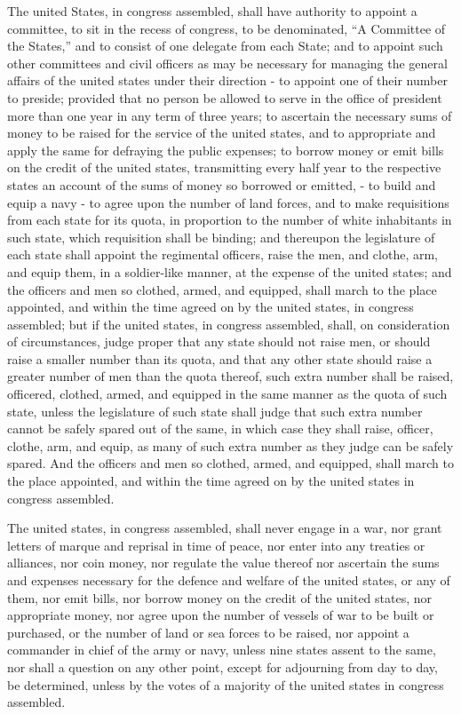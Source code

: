 The united States, in congress assembled, shall have authority to appoint a committee, to sit in the recess of congress, to be denominated, “A Committee of the States,” and to consist of one delegate from each State; and to appoint such other committees and civil officers as may be necessary for managing the general affairs of the united states under their direction - to appoint one of their number to preside; provided that no person be allowed to serve in the office of president more than one year in any term of three years; to ascertain the necessary sums of money to be raised for the service of the united states, and to appropriate and apply the same for defraying the public expenses; to borrow money or emit bills on the credit of the united states, transmitting every half year to the respective states an account of the sums of money so borrowed or emitted, -  to build and equip a navy - to agree upon the number of land forces, and to make requisitions from each state for its quota, in proportion to the number of white inhabitants in such state, which requisition shall be binding; and thereupon the legislature of each state shall appoint the regimental officers, raise the men, and clothe, arm, and equip them, in a soldier-like manner, at the expense of the united states; and the officers and men so clothed, armed, and equipped, shall march to the place appointed, and within the time agreed on by the united states, in congress assembled; but if the united states, in congress assembled, shall, on consideration of circumstances, judge proper that any state should not raise men, or should raise a smaller number than its quota, and that any other state should raise a greater number of men than the quota thereof, such extra number shall be raised, officered, clothed, armed, and equipped in the same manner as the quota of such state, unless the legislature of such state shall judge that such extra number cannot be safely spared out of the same, in which case they shall raise, officer, clothe, arm, and equip, as many of such extra number as they judge can be safely spared. And the officers and men so clothed, armed, and equipped, shall march to the place appointed, and within the time agreed on by the united states in congress assembled.

The united states, in congress assembled, shall never engage in a war, nor grant letters of marque and reprisal in time of peace, nor enter into any treaties or alliances, nor coin money, nor regulate the value thereof nor ascertain the sums and expenses necessary for the defence and welfare of the united states, or any of them, nor emit bills, nor borrow money on the credit of the united states, nor appropriate money, nor agree upon the number of vessels of war to be built or purchased, or the number of land or sea forces to be raised, nor appoint a commander in chief of the army or navy, unless nine states assent to the same, nor shall a question on any other point, except for adjourning from day to day, be determined, unless by the votes of a majority of the united states in congress assembled.

